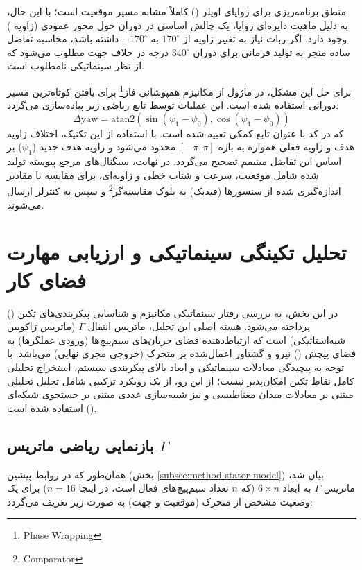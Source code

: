	منطق برنامه‌ریزی برای زوایای اویلر () کاملاً مشابه مسیر موقعیت است؛ با این حال، به دلیل ماهیت دایره‌ای زوایا، یک چالش اساسی در دوران حول محور عمودی (زاویه ) وجود دارد. اگر ربات نیاز به تغییر زاویه از $170^\circ$ به $-170^\circ$ داشته باشد، محاسبه تفاضل ساده منجر به تولید فرمانی برای دوران $340^\circ$ درجه در خلاف جهت مطلوب می‌شود که از نظر سینماتیکی نامطلوب است.
	
	برای حل این مشکل، در ماژول  از مکانیزم همپوشانی فاز\footnote{Phase Wrapping} برای یافتن کوتاه‌ترین مسیر دورانی استفاده شده است. این عملیات توسط تابع ریاضی زیر پیاده‌سازی می‌گردد:
	$$ \Delta \text{yaw} = \text{atan2}(\sin(\psi_1 - \psi_0), \cos(\psi_1 - \psi_0)) $$
	که در کد با عنوان تابع کمکی  تعبیه شده است. با استفاده از این تکنیک، اختلاف زاویه هدف و زاویه فعلی همواره به بازه $[-\pi, \pi]$ محدود می‌شود و زاویه هدف جدید ($\psi_1$) بر اساس این تفاضل مینیمم تصحیح می‌گردد. در نهایت، سیگنال‌های مرجع پیوسته تولید شده شامل موقعیت، سرعت و شتاب خطی و زاویه‌ای، برای مقایسه با مقادیر اندازه‌گیری شده از سنسورها (فیدبک) به بلوک مقایسه‌گر\footnote{Comparator} و سپس به کنترلر ارسال می‌شوند.
	
\section{تحلیل تکینگی سینماتیکی و ارزیابی مهارت فضای کار}
\label{sec:method-singularity}

در این بخش، به بررسی رفتار سینماتیکی مکانیزم و شناسایی پیکربندی‌های تکین () پرداخته می‌شود. هسته اصلی این تحلیل، ماتریس انتقال $\Gamma$ (ماتریس ژاکوبین شبه‌استاتیکی) است که ارتباط‌دهنده فضای جریان‌های سیم‌پیچ‌ها (ورودی عملگرها) به فضای پیچش () نیرو و گشتاور اعمال‌شده بر متحرک (خروجی مجری نهایی) می‌باشد. با توجه به پیچیدگی معادلات سینماتیکی و ابعاد بالای پیکربندی سیستم، استخراج تحلیلی کامل نقاط تکین امکان‌پذیر نیست؛ از این رو، از یک رویکرد ترکیبی شامل تحلیل تحلیلی مبتنی بر معادلات میدان مغناطیسی و نیز شبیه‌سازی عددی مبتنی بر جستجوی شبکه‌ای () استفاده شده است.

\subsection{بازنمایی ریاضی ماتریس $\Gamma$}
\label{subsec:method-gamma-definition}

همان‌طور که در روابط پیشین (بخش \ref{subsec:method-stator-model}) بیان شد، ماتریس $\Gamma$ به ابعاد $6 \times n$ (که $n$ تعداد سیم‌پیچ‌های فعال است، در اینجا $n=16$) برای یک وضعیت مشخص از متحرک (موقعیت و جهت) به صورت زیر تعریف می‌گردد:

